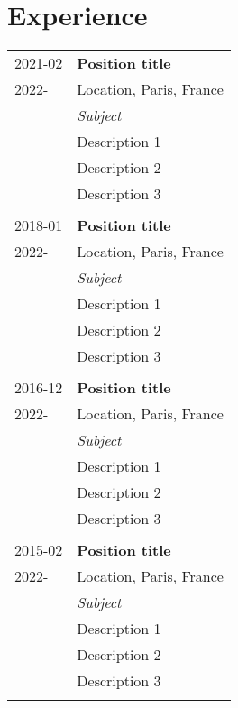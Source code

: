 \section{Experience}
\begin{tabularx}{\textwidth}{l|X}

\textsc{2021-02} 
&\textbf{Position title}\\
\textsc{2022-}
&Location, Paris, France\\
&\emph{Subject}\\
&\footnotesize{Description 1}\\
&\footnotesize{Description 2}\\
&\footnotesize{Description 3}\\

\multicolumn{2}{c}{}\\

\textsc{2018-01} 
&\textbf{Position title}\\
\textsc{2022-}
&Location, Paris, France\\
&\emph{Subject}\\
&\footnotesize{Description 1}\\
&\footnotesize{Description 2}\\
&\footnotesize{Description 3}\\
 
\multicolumn{2}{c}{}\\
 
\textsc{2016-12} 
&\textbf{Position title}\\
\textsc{2022-}
&Location, Paris, France\\
&\emph{Subject}\\
&\footnotesize{Description 1}\\
&\footnotesize{Description 2}\\
&\footnotesize{Description 3}\\
 
\multicolumn{2}{c}{}\\
 
\textsc{2015-02}
&\textbf{Position title}\\
\textsc{2022-}
&Location, Paris, France\\
&\emph{Subject}\\
&\footnotesize{Description 1}\\
&\footnotesize{Description 2}\\
&\footnotesize{Description 3}\\

\multicolumn{2}{c}{}\\
\end{tabularx}
